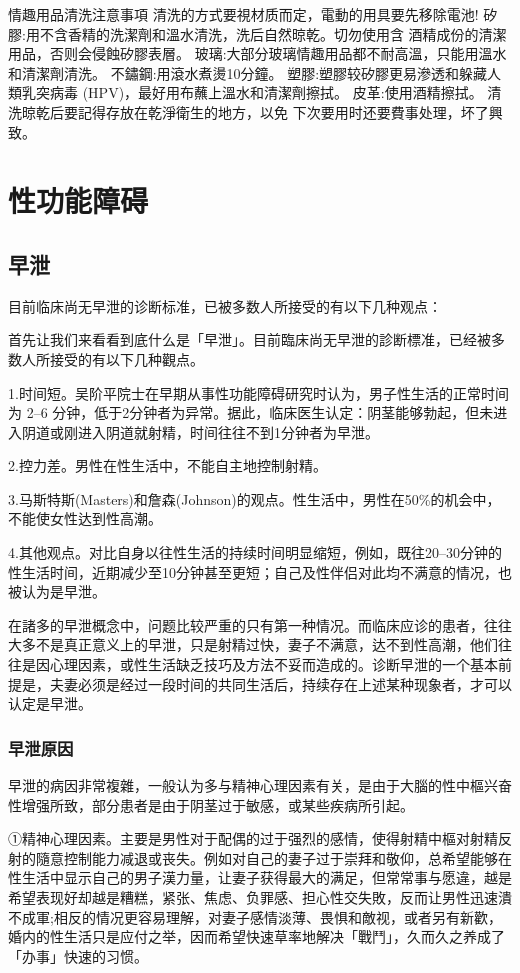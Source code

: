 \documentclass[12pt,UTF8]{ctexbook}
\begin{document}
情趣用品清洗注意事項
清洗的方式要視材质而定，電動的用具要先移除電池!
矽膠:用不含香精的洗潔劑和溫水清洗，洗后自然晾乾。切勿使用含
酒精成份的清潔用品，否则会侵蝕矽膠表層。
玻璃:大部分玻璃情趣用品都不耐高溫，只能用溫水和清潔劑清洗。
不鏽鋼:用滾水煮燙10分鐘。
塑膠:塑膠较矽膠更易滲透和躲藏人類乳突病毒
(HPV)，最好用布蘸上溫水和清潔劑擦拭。
皮革:使用酒精擦拭。
清洗晾乾后要記得存放在乾淨衛生的地方，以免
下次要用时还要費事处理，坏了興致。

\part{性功能障碍}

\chapter{早泄}

目前临床尚无早泄的诊断标准，已被多数人所接受的有以下几种观点：

首先让我们来看看到底什么是「早泄」。目前臨床尚无早泄的診断標准，已经被多数人所接受的有以下几种觀点。

1.时间短。吴阶平院士在早期从事性功能障碍研究时认为，男子性生活的正常时间为 2--6 分钟，低于2分钟者为异常。据此，临床医生认定：阴茎能够勃起，但未进入阴道或刚进入阴道就射精，时间往往不到1分钟者为早泄。

2.控力差。男性在性生活中，不能自主地控制射精。

3.马斯特斯(Masters)和詹森(Johnson)的观点。性生活中，男性在50\%的机会中，不能使女性达到性高潮。

4.其他观点。对比自身以往性生活的持续时间明显缩短，例如，既往20--30分钟的性生活时间，近期减少至10分钟甚至更短；自己及性伴侣对此均不满意的情况，也被认为是早泄。

在諸多的早泄概念中，问题比较严重的只有第一种情况。而临床应诊的患者，往往大多不是真正意义上的早泄，只是射精过快，妻子不满意，达不到性高潮，他们往往是因心理因素，或性生活缺乏技巧及方法不妥而造成的。诊断早泄的一个基本前提是，夫妻必须是经过一段时间的共同生活后，持续存在上述某种现象者，才可以认定是早泄。

\section{早泄原因}

早泄的病因非常複雜，一般认为多与精神心理因素有关，是由于大腦的性中樞兴奋性增强所致，部分患者是由于阴茎过于敏感，或某些疾病所引起。

①精神心理因素。主要是男性对于配偶的过于强烈的感情，使得射精中樞对射精反射的隨意控制能力减退或丧失。例如对自己的妻子过于崇拜和敬仰，总希望能够在性生活中显示自己的男子漢力量，让妻子获得最大的满足，但常常事与愿違，越是希望表现好却越是糟糕，紧张、焦虑、负罪感、担心性交失敗，反而让男性迅速潰不成軍;相反的情况更容易理解，对妻子感情淡薄、畏惧和敵视，或者另有新歡，婚内的性生活只是应付之举，因而希望快速草率地解决「戰鬥」，久而久之养成了「办事」快速的习惯。
\end{document}
